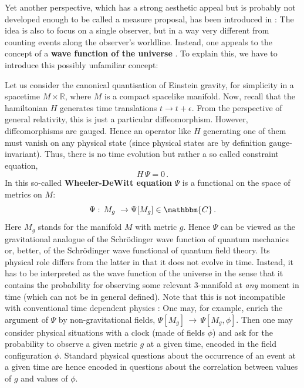 \documentclass[12pt]{article}
\newcommand{\be}{\begin{equation}}
\newcommand{\ee}{\end{equation}}
\numberwithin{equation}{section}
\begin{document}
Yet another perspective, which has a strong aesthetic appeal but is probably not developed enough to be called a measure proposal, has been introduced in \cite{Hartle:2016tpo}: The idea is also to focus on a single observer, but in a way very different from counting events along the observer's worldline. Instead, one appeals to the concept of a {\bf wave function of the universe} \cite{DeWitt:1967yk, Wheeler:1988zr, Hartle:1983ai}. To explain this, we have to introduce this possibly unfamiliar concept:

Let us consider the canonical quantisation of Einstein gravity, for simplicity in a spacetime $M\times \mathbb{R}$, where $M$ is a compact spacelike manifold. Now, recall that the hamiltonian $H$ generates time translations   $t \to t + \epsilon$. From the perspective of general relativity, this is just a particular diffeomorphism. However,  diffeomorphisms are gauged. Hence an operator like $H$ generating one of them must vanish on any physical state (since physical states are by definition gauge-invariant). Thus, there is no time evolution but rather a so called constraint equation,
\be
H\,\Psi=0\,.
\ee
In this so-called {\bf Wheeler-DeWitt equation} $\Psi$ is a functional on the space of metrics on $M$:
\be
\Psi:\,M_g\,\,\to \Psi[M_g]\in\mathbbm{C}\,.
\ee
Here $M_g$ stands for the manifold $M$ with metric $g$. Hence $\Psi$ can be viewed as the gravitational analogue of the Schr\"odinger wave function of quantum mechanics or, better, of the Schr\"odinger wave functional of quantum field theory. Its physical role differs from the latter in that it does not evolve in time. Instead, it has to be interpreted as the wave function of the universe in the sense that it contains the probability for observing some relevant 3-manifold at {\it any} moment in time (which can not be in general defined). Note that this is not incompatible with conventional time dependent physics \cite{Banks:1984cw}: One may, for example, enrich the argument of $\Psi$ by non-gravitational fields, $\Psi[M_g]\,\to\,\Psi[M_g,\phi]$. Then one may consider physical situations with a clock (made of fields $\phi$) and ask for the probability to observe a given metric $g$ at a given time, encoded in the field configuration $\phi$. Standard physical questions about the occurrence of an event at a given time are hence encoded in questions about the correlation between values of $g$ and values of $\phi$.
\end{document}

